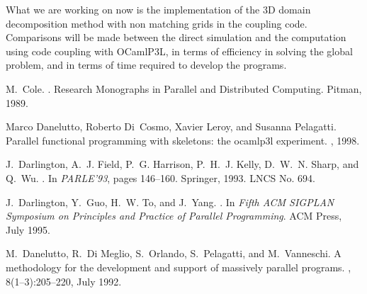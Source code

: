 \documentclass{article}
\begin{document}
What we are working on now is the implementation of the 3D domain decomposition
method with non matching grids in the coupling code. Comparisons will be made
between the direct simulation and the computation using code coupling with
OCamlP3L, in terms of efficiency in solving the global problem, and in terms of
time required to develop the programs.




\newcommand{\etalchar}[1]{$^{#1}$}
\begin{thebibliography}{DDCLP98}

M.~Cole.
.
\newblock Research Monographs in Parallel and Distributed Computing. Pitman,
  1989.

Marco Danelutto, Roberto Di~Cosmo, Xavier Leroy, and Susanna Pelagatti.
\newblock Parallel functional programming with skeletons: the ocamlp3l
  experiment.
, 1998.

\bibitem[DFH{\etalchar{+}}93]{ic-parle-93-1}
J.~Darlington, A.~J. Field, P.~G. Harrison, P.~H.~J. Kelly, D.~W.~N. Sharp, and
  Q.~Wu.
.
\newblock In {\em PARLE'93}, pages 146--160. Springer, 1993.
\newblock LNCS No. 694.

J.~Darlington, Y.~Guo, H.~W. To, and J.~Yang.
.
\newblock In {\em Fifth ACM SIGPLAN Symposium on Principles and Practice of
  Parallel Programming}. ACM Press, July 1995.

\bibitem[DMO{\etalchar{+}}92]{fgcs-firenze}
M.~Danelutto, R.~Di Meglio, S.~Orlando, S.~Pelagatti, and M.~Vanneschi.
\newblock A methodology for the development and support of massively parallel
  programs.
, 8(1--3):205--220, July
  1992.

\end{thebibliography}


%
\end{document}
